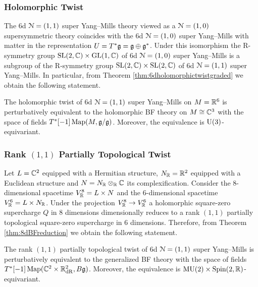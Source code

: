 \documentclass[10pt, oneside]{article}
\begin{document}
\subsubsection{Holomorphic Twist}
\label{sect:6d11holomorphictwist}

The 6d $\mathcal N=(1, 1)$ super Yang--Mills theory viewed as a $\mathcal N=(1, 0)$ supersymmetric theory coincides with the 6d $\mathcal N=(1, 0)$ super Yang--Mills with matter in the representation $U=T^*\mathfrak g=\mathfrak g\oplus \mathfrak g^*$. Under this isomorphism the R-symmetry group $\mathrm{SL}(2, \mathbb C)\times \mathrm{GL}(1, \mathbb C)$ of 6d $\mathcal N=(1, 0)$ super Yang--Mills is a subgroup of the R-symmetry group $\mathrm{SL}(2, \mathbb C)\times \mathrm{SL}(2, \mathbb C)$ of 6d $\mathcal N=(1, 1)$ super Yang--Mills. In particular, from Theorem \ref{thm:6dholomorphictwistgraded} we obtain the following statement.

\begin{theorem}
The holomorphic twist of 6d $\mathcal N=(1, 1)$ super Yang--Mills on $M=\mathbb R^6$ is perturbatively equivalent to the holomorphic BF theory on $M\cong \mathbb C^3$ with the space of fields $T^*[-1]\operatorname{Map}(M, \mathfrak g/\mathfrak g)$. Moreover, the equivalence is $\mathrm{U}(3)$-equivariant.
\label{thm:6d11holomorphictwist}
\end{theorem}

\subsubsection{Rank \texorpdfstring{$(1, 1)$}{(1,1)} Partially Topological Twist}
\label{sect:6d11partialtwist}

Let $L=\mathbb C^2$ equipped with a Hermitian structure, $N_\mathbb R=\mathbb R^2$ equipped with a Euclidean structure and $N=N_\mathbb R\otimes_\mathbb R\mathbb C$ its complexification. Consider the 8-dimensional spacetime $V^8_\mathbb R=L\times N$ and the 6-dimensional spacetime $V^6_\mathbb R=L\times N_\mathbb R$. Under the projection $V^8_\mathbb R\rightarrow V^6_\mathbb R$ a holomorphic square-zero supercharge $Q$ in 8 dimensions dimensionally reduces to a rank $(1, 1)$ partially topological square-zero supercharge in 6 dimensions. Therefore, from Theorem \ref{thm:8dBFreduction} we obtain the following statement.

\begin{theorem}
The rank $(1, 1)$ partially topological twist of 6d $\mathcal N=(1, 1)$ super Yang--Mills is perturbatively equivalent to the generalized BF theory with the space of fields $T^*[-1]\operatorname{Map}(\mathbb C^2\times \mathbb R^2_{\mathrm{dR}}, B\mathfrak g)$. Moreover, the equivalence is $\mathrm{MU}(2)\times\mathrm{Spin}(2, \mathbb R)$-equivariant.
\end{theorem}
\end{document}
